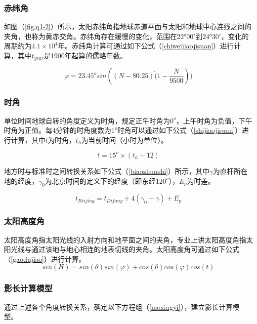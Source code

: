 \documentclass[withoutpreface,bwprint]{cumcmthesis} %
\begin{document}
\subsubsection{赤纬角}
如图（\ref{fig:q1-2}）所示，太阳赤纬角指地球赤道平面与太阳和地球中心连线之间的夹角，也称为黄赤交角。赤纬角存在缓慢的变化，范围在$22°00′$到$24°30′$，变化的周期约为$4.1×10^4$年。赤纬角计算可通过如下公式（\ref{chiweijiaojisuan}）进行计算，其中$t_{year}$是1900年起算的儒略年数。

\begin{equation}
\label{chiweijiaojisuan}
	\varphi = 23.45^osin((N-80.25)\dot(1-\frac{N}{9500}))	
\end{equation}

\subsubsection{时角}

\par 单位时间地球自转的角度定义为时角，规定正午时角为$0^o$，上午时角为负值，下午时角为正值。每$4$分钟的时角度数为$1^o$时角可以通过如下公式（\ref{shijiaojisuan}）进行计算，其中$t$为时角，$t_h$为当前时间（小时为单位）。

\begin{equation}
	\label{shijiaojisuan}
	t = 15^o\times (t_h-12)
\end{equation}

\par 地方时与标准时之间转换关系如下公式（\ref{biaozhunshi}）所示，其中$\gamma$为直杆所在地的经度，$\gamma_0$为北京时间的定义下的经度（即东经$120^o$），$E_p$为时差。

\begin{equation}
\label{biaozhunshi}
	t_{Beijing} = t_{Difang}+4(\gamma_0 - \gamma)+E_p
\end{equation}

\subsubsection{太阳高度角}
太阳高度角指太阳光线的入射方向和地平面之间的夹角，专业上讲太阳高度角指太阳光线与通过该地与地心相连的地表切线的夹角。太阳高度角可通过如下公式（\ref{gaodujiao}）进行计算。
\begin{equation}
	\label{gaodujiao}
	sin(H) = sin(\theta)sin(\varphi)+cos(\theta)cos(\varphi)cos(t)
\end{equation}

\subsubsection{影长计算模型}
通过上述各个角度转换关系，确定以下方程组（\ref{moxingyi}），建立影长计算模型。
\end{document}
